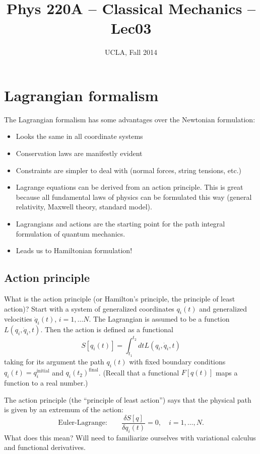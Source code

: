 \documentclass[12pt]{article} %
\title{Phys 220A -- Classical Mechanics -- Lec03}
\author{UCLA, Fall 2014}
\date{\formatdate{09}{10}{2014}} %
\begin{document}
\setlength{\unitlength}{1mm}
\maketitle


\section{Lagrangian formalism}

The Lagrangian formalism has some advantages over the Newtonian formulation:
\begin{itemize}
\item Looks the same in all coordinate systems
\item Conservation laws are manifestly evident
\item Constraints are simpler to deal with (normal forces, string tensions, etc.)
\item Lagrange equations can be derived from an action principle. This is great because all fundamental laws of physics can be formulated this way (general relativity, Maxwell theory, standard model). 
\item Lagrangians and actions are the starting point for the path integral formulation of quantum mechanics.
\item Leads us to Hamiltonian formulation!
\end{itemize}


\subsection{Action principle}

What is the action principle (or Hamilton's principle, the principle of least action)? Start with a system of generalized coordinates $q_i(t)$ and generalized velocities $\dot{q}_i(t)$, $i = 1, \dots N$. The Lagrangian is assumed to be a function $L(q_i, \dot{q}_i, t)$. Then the action is defined as a functional
\begin{equation}
S[q_i(t)] = \int_{t_1}^{t_2} dt L(q_i, \dot{q}_i, t)
\end{equation}
taking for its argument the path $q_i(t)$ with fixed boundary conditions $q_i(t) = q_i^\text{initial}$ and $q_i(t_2)^\text{final}$. (Recall that a functional $F[q(t)]$ maps a function to a real number.) 

The action principle (the ``principle of least action'') says that the physical path is given by an extremum of the action:
\begin{equation}
\text{Euler-Lagrange:}	\qquad	\frac{\delta S[q]}{\delta q_i(t)} = 0, \quad i = 1, \dots, N. 
\end{equation}
What does this mean? Will need to familiarize ourselves with variational calculus and functional derivatives. 
\end{document}
